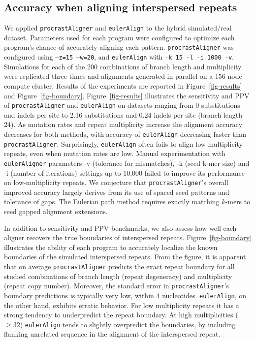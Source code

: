 \documentclass{llncs}
\begin{document}
\subsection{Accuracy when aligning interspersed repeats}
We applied \texttt{procrastAligner} and \texttt{eulerAlign} to the
hybrid simulated/real dataset.  Parameters used for each program were
configured to optimize each program's chance of accurately aligning
each pattern. \texttt{procrastAligner} was configured using \texttt{--z=15 --w=20}, and \texttt{eulerAlign} with \texttt{-k 15 -l -i 1000 -v}.
Simulations for each of the 200 combinations of branch length and
multiplicity were replicated three times and alignments generated in
parallel on a 156 node compute cluster.  Results of the experiments
are reported in Figure~\ref{fig-results} and
Figure~\ref{fig-boundary}. Figure~\ref{fig-results} illustrates the
sensitivity and PPV of \texttt{procrastAligner} and
\texttt{eulerAlign} on datasets ranging from 0 substitutions and
indels per site to 2.16 substitutions and 0.24 indels per site (branch length 24).  As
mutation rates and repeat multiplicity increase the alignment accuracy
decreases for both methods, with accuracy of \texttt{eulerAlign}
decreasing faster than \texttt{procrastAligner}.  Surprisingly, \texttt{eulerAlign}
often fails to align low multiplicity repeats, even when mutation rates are low.
Manual experimentation with \texttt{eulerAligner} parameters -v (tolerance for mismatches), -k (seed k-mer size) and -i (number of iterations) settings up to 10,000 failed to improve its performance on low-multiplicity repeats.
We conjecture that \texttt{procrastAligner}'s overall improved accuracy largely derives
from its use of spaced seed patterns\cite{ref-procrast} and tolerance
of gaps. The Eulerian path method requires exactly matching $k$-mers
to seed gapped alignment extensions.

In addition to sensitivity and PPV benchmarks, we also assess how well
each aligner recovers the true boundaries of interspersed
repeats.  Figure~\ref{fig-boundary} illustrates the ability of each
program to accurately localize the known boundaries of the simulated interspersed
repeats. From the figure, it is apparent that on average \texttt{procrastAligner} predicts
the exact repeat boundary for all studied combinations of branch length (repeat degeneracy)
and multiplicity (repeat copy number).  Moreover, the standard error in \texttt{procrastAligner}'s
boundary predictions is typically very low, within 4 nucleotides.  \texttt{eulerAlign}, on the other hand,
exhibits erratic behavior.  For low multiplicity repeats it has a strong tendency to
underpredict the repeat boundary.  At high multiplicities ($\geq32$) \texttt{eulerAlign} tends to
slightly overpredict the boundaries, by including flanking unrelated sequence in the alignment of
the interspersed repeat.
\end{document}

